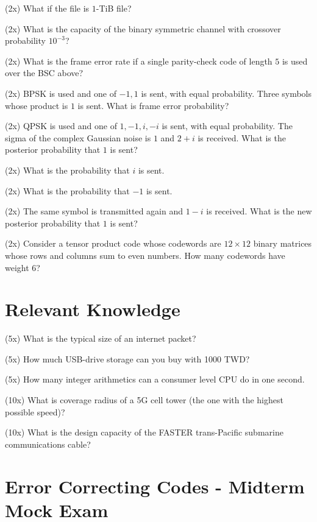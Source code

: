 \documentclass[a4paper]{article}
\begin{document}
\Problem{6em} (2x)
What if the file is $1$-TiB file?

\Problem{6em} (2x)
What is the capacity of the binary symmetric channel
with crossover probability $10^{-3}$?

\Problem{6em} (2x)
What is the frame error rate if a single parity-check code
of length $5$ is used over the BSC above?

\Problem{6em} (2x)
BPSK is used and one of $-1, 1$ is sent, with equal probability.
Three symbols whose product is $1$ is sent.
What is frame error probability?

\Problem{6em} (2x)
QPSK is used and one of $1, -1, i, -i$ is sent, with equal probability.
The sigma of the complex Gaussian noise is $1$ and $2 + i$ is received.
What is the posterior probability that $1$ is sent?

\Problem{6em} (2x)
What is the probability that $i$ is sent.

\Problem{6em} (2x)
What is the probability that $-1$ is sent.

\Problem{6em} (2x)
The same symbol is transmitted again and $1 - i$ is received.
What is the new posterior probability that $1$ is sent?

\Problem{6em} (2x)
Consider a tensor product code whose codewords are
$12 \times 12$ binary matrices whose rows and columns sum to even numbers.
How many codewords have weight $6$?

\section{Relevant Knowledge}

\Problem{6em} (5x)
What is the typical size of an internet packet?

\Problem{6em} (5x)
How much USB-drive storage can you buy with 1000 TWD?

\Problem{6em} (5x)
How many integer arithmetics can a consumer level CPU do in one second.

\Problem{6em} (10x)
What is coverage radius of a 5G cell tower
(the one with the highest possible speed)?

\Problem{6em} (10x)
What is the design capacity of the FASTER
trans-Pacific submarine communications cable?


\clearpage

\section*{Error Correcting Codes - Midterm Mock Exam}
\end{document}
